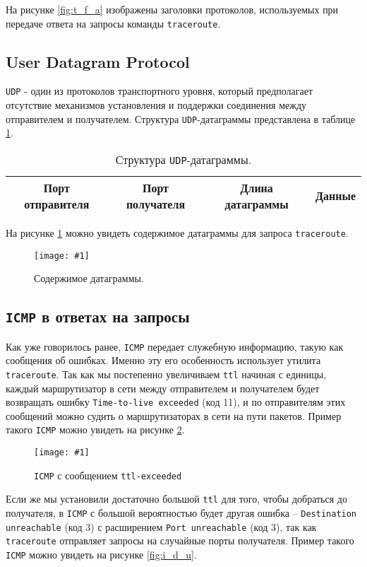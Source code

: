 \documentclass[12pt, a4paper]{article}
\newcommand{\figc}[4]{
  \begin{figure}[H]
  \begin{center}
    \texttt{[image: \#1]}
    \caption{#2}
    \label{fig:#3}
  \end{center}
  \end{figure}
}
\begin{document}
На рисунке \ref{fig:t_f_a} изображены заголовки протоколов, используемых при
передаче ответа на запросы команды \texttt{traceroute}.

\subsection{User Datagram Protocol}

\texttt{UDP} - один из протоколов транспортного уровня, который предполагает отсутствие
механизмов установления и поддержки соединения между отправителем и получателем.
Структура \texttt{UDP}-датаграммы представлена в таблице \ref{Tab:udp}.

\begin{table}[h]
\begin{center}
  \caption{Структура \texttt{UDP}-датаграммы.}
  \begin{tabular}{| c | c | c | c |}
    \hline
    Порт отправителя & Порт получателя & Длина датаграммы & Данные\\
    \hline
  \end{tabular}
  \label{Tab:udp}
\end{center}
\end{table}

На рисунке \ref{fig:t_u} можно увидеть содержимое датаграммы для запроса
\texttt{traceroute}.

\figc{trace_udp}{Содержимое датаграммы.}{t_u}{3.0}

\subsection{\texttt{ICMP} в ответах на запросы}

Как уже говорилось ранее, \texttt{ICMP} передает служебную информацию, такую
как сообщения об ошибках. Именно эту его особенность использует утилита
\texttt{traceroute}. Так как мы постепенно увеличиваем \texttt{ttl} начиная
с единицы, каждый маршрутизатор в сети между отправителем и получателем будет
возвращать ошибку \texttt{Time-to-live exceeded} (код 11), и по отправителям этих
сообщений можно судить о маршрутизаторах в сети на пути пакетов. Пример такого
\texttt{ICMP} можно увидеть на рисунке \ref{fig:i_t_e}.

\figc{icmp_ttl_exceeded}{\texttt{ICMP} с сообщением \texttt{ttl-exceeded}}{i_t_e}{3.0}

Если же мы установили достаточно большой \texttt{ttl} для того, чтобы добраться
до получателя, в \texttt{ICMP} с большой вероятностью будет другая ошибка --
\texttt{Destination unreachable} (код 3) с расширением \texttt{Port unreachable}
(код 3), так как \texttt{traceroute} отправляет запросы на случайные порты
получателя. Пример такого \texttt{ICMP} можно увидеть на рисунке \ref{fig:i_d_u}.
\end{document}
